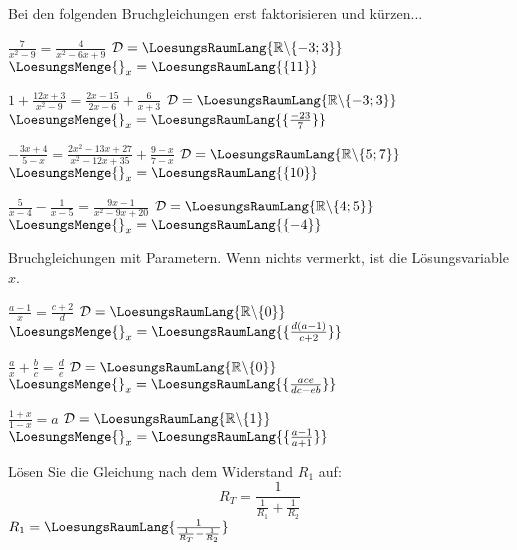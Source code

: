 \platzFuerBerechnungenBisEndeSeite{}

Bei den folgenden Bruchgleichungen erst faktorisieren und kürzen...

\begin{bbwAufgabenBlock}
\item $\frac7{x^2-9} = \frac4{x^2-6x+9}$ \hspace{10mm}    $\mathcal{D}= \LoesungsRaumLang{\mathbb{R}\backslash\{-3; 3\}}$ $\LoesungsMenge{}_x = \LoesungsRaumLang{\{11\}}$
\item $1 + \frac{12x+3}{x^2-9} = \frac{2x-15}{2x-6} + \frac{6}{x+3}$ \hspace{10mm}    $\mathcal{D}= \LoesungsRaumLang{\mathbb{R}\backslash\{-3; 3\}}$ $\LoesungsMenge{}_x = \LoesungsRaumLang{\{\frac{-23}{7}\}}$
\item $- \frac{3x+4}{5-x} = \frac{2x^2-13x+27}{x^2-12x+35} + \frac{9-x}{7-x}$ \hspace{10mm}    $\mathcal{D}= \LoesungsRaumLang{\mathbb{R}\backslash\{5;7\}}$ $\LoesungsMenge{}_x = \LoesungsRaumLang{\{10\}}$\noTRAINER{\newpage}
\item $\frac5{x-4} - \frac1{x-5} = \frac{9x-1}{x^2-9x+20}$ \hspace{10mm}    $\mathcal{D}= \LoesungsRaumLang{\mathbb{R}\backslash\{4;5\}}$ $\LoesungsMenge{}_x = \LoesungsRaumLang{\{-4\}}$
\end{bbwAufgabenBlock}



\platzFuerBerechnungenBisEndeSeite{}







Bruchgleichungen mit Parametern. Wenn nichts vermerkt, ist die
Lösungsvariable $x$.

\begin{bbwAufgabenBlock}
\item $\frac{a-1}x = \frac{c+2}d$ \hspace{10mm}    $\mathcal{D}= \LoesungsRaumLang{\mathbb{R}\backslash\{0\}}$ $\LoesungsMenge{}_x = \LoesungsRaumLang{\{\frac{d(a-1)}{c+2}\}}$
\item $\frac{a}x + \frac{b}c = \frac{d}e$ \hspace{10mm}    $\mathcal{D}= \LoesungsRaumLang{\mathbb{R}\backslash\{0\}}$ $\LoesungsMenge{}_x = \LoesungsRaumLang{\{\frac{ace}{dc-eb}\}}$
\item $\frac{1+x}{1-x} = a$ \hspace{10mm}    $\mathcal{D}= \LoesungsRaumLang{\mathbb{R}\backslash\{1\}}$ $\LoesungsMenge{}_x = \LoesungsRaumLang{\{\frac{a-1}{a+1}\}}$\noTRAINER{\newpage}
\item Lösen Sie die Gleichung nach dem Widerstand $R_1$ auf:
      $$R_T = \frac1{\frac1{R_1} + \frac1{R_2}}$$    $R_1 = \LoesungsRaumLang{\frac1{\frac1{R_T}-\frac1{R_2}}}$
\end{bbwAufgabenBlock}


